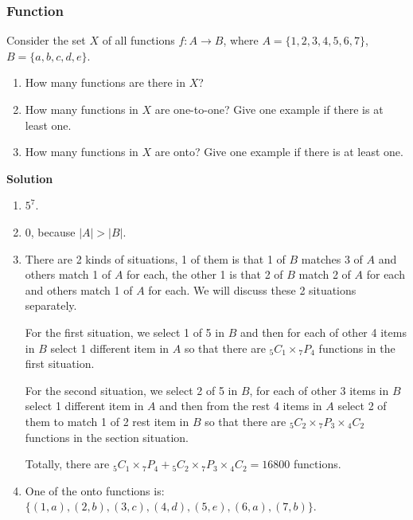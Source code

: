 \documentclass[10pt, compress]{beamer}
\begin{document}
\begin{frame}[allowframebreaks]
\frametitle{Function}
Consider the set $X$ of all functions $f \colon A \rightarrow B$, where $A = \{1, 2, 3, 4, 5, 6, 7\}$, $B = \{a, b, c, d, e\}$.\begin{enumerate}
	\item How many functions are there in $X$?
	\item How many functions in $X$ are one-to-one? Give one example if there is at least one.
	\item How many functions in $X$ are onto? Give one example if there is at least one.
\end{enumerate}
\textbf{Solution} \begin{enumerate}
	\item $5^7$.
	\item $0$, because $|A| > |B|$.
	\item There are 2 kinds of situations, 1 of them is that 1 of $B$ matches 3 of $A$ and others match 1 of $A$ for each, the other 1 is that 2 of $B$ match 2 of $A$ for each and others match 1 of $A$ for each. We will discuss these 2 situations separately.
	
	For the first situation, we select 1 of 5 in $B$ and then for each of other 4 items in $B$ select 1 different item in $A$ so that there are ${}_5 C_1 \times {}_7 P_4$ functions in the first situation.
	
	For the second situation, we select 2 of 5 in $B$, for each of other 3 items in $B$ select 1 different item in $A$ and then from the rest 4 items in $A$ select 2 of them to match 1 of 2 rest item in $B$ so that there are ${}_5 C_2 \times {}_7 P_3 \times {}_4 C_2$ functions in the section situation.
	
	Totally, there are ${}_5 C_1 \times {}_7 P_4 + {}_5 C_2 \times {}_7 P_3 \times {}_4 C_2 = 16800$ functions.
	
	\item One of the onto functions is: $\{(1, a), (2, b), (3, c), (4, d), (5, e), (6, a), (7, b)\}$.
\end{enumerate}
\end{frame}
\end{document}
